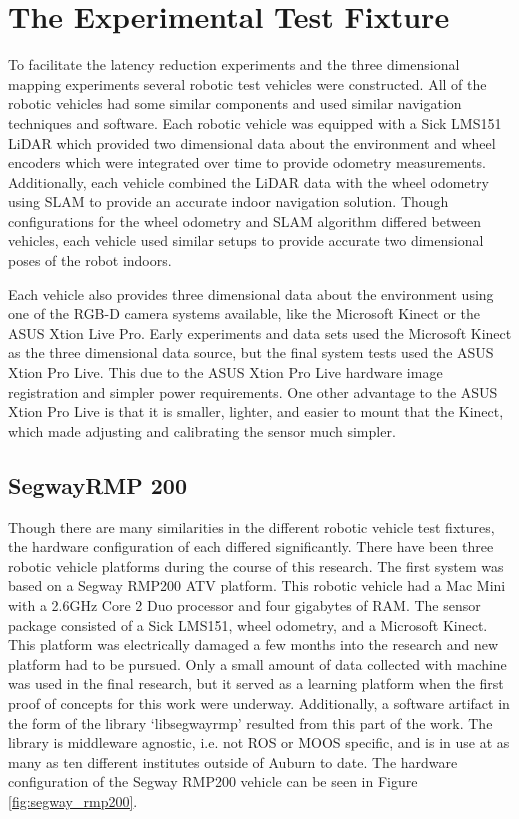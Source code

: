 \documentclass[12pt]{report}
\begin{document}
\section{The Experimental Test Fixture}\label{sec:robotic_vehicle}
To facilitate the latency reduction experiments and the three dimensional mapping experiments several robotic test vehicles were constructed.  All of the robotic vehicles had some similar components and used similar navigation techniques and software.  Each robotic vehicle was equipped with a Sick LMS151 LiDAR which provided two dimensional data about the environment and wheel encoders which were integrated over time to provide odometry measurements.  Additionally, each vehicle combined the LiDAR data with the wheel odometry using SLAM\cite{grisetti2007improved}\cite{grisettiyz2005improving} to provide an accurate indoor navigation solution.  Though configurations for the wheel odometry and SLAM algorithm differed between vehicles, each vehicle used similar setups to provide accurate two dimensional poses of the robot indoors.

Each vehicle also provides three dimensional data about the environment using one of the RGB-D camera systems available, like the Microsoft Kinect or the ASUS Xtion Live Pro.  Early experiments and data sets used the Microsoft Kinect as the three dimensional data source, but the final system tests used the ASUS Xtion Pro Live.  This due to the ASUS Xtion Pro Live hardware image registration and simpler power requirements.  One other advantage to the ASUS Xtion Pro Live is that it is smaller, lighter, and easier to mount that the Kinect, which made adjusting and calibrating the sensor much simpler.

\subsection{SegwayRMP 200}
Though there are many similarities in the different robotic vehicle test fixtures, the hardware configuration of each differed significantly.  There have been three robotic vehicle platforms during the course of this research.  The first system was based on a Segway RMP200 ATV platform.  This robotic vehicle had a Mac Mini with a 2.6GHz Core 2 Duo processor and four gigabytes of RAM.  The sensor package consisted of a Sick LMS151, wheel odometry, and a Microsoft Kinect.  This platform was electrically damaged a few months into the research and new platform had to be pursued.  Only a small amount of data collected with machine was used in the final research, but it served as a learning platform when the first proof of concepts for this work were underway.  Additionally, a software artifact in the form of the library `libsegwayrmp' resulted from this part of the work.  The library is middleware agnostic, i.e. not ROS or MOOS specific, and is in use at as many as ten different institutes outside of Auburn to date.  The hardware configuration of the Segway RMP200 vehicle can be seen in Figure \ref{fig:segway_rmp200}.
\end{document}
